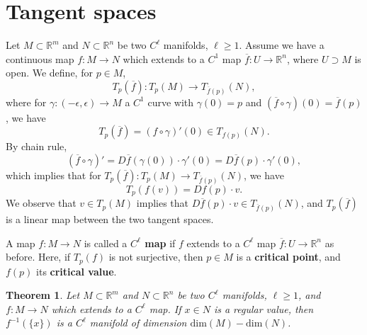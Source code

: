 \documentclass[letter-paper]{tufte-book}
\newtheorem{theorem}{\color{pastel-blue}Theorem}[section]
\begin{document}

\section{Tangent spaces}

Let $M \subset \mathbb{R}^m$ and $N \subset \mathbb{R}^n$ be two $C^\ell$
manifolds, $\ell \geq 1$. Assume we have a continuous map $f : M \to N$ which
extends to a $C^1$ map $\overline{f} : U \to \mathbb{R}^n$, where $U \supset M$
is open. We define, for $p \in M$,
\begin{equation*}
  T_p(\overline{f}) : T_p (M) \to  T_{\overline{f}(p)}(N),
\end{equation*}
where for $\gamma : (-\epsilon, \epsilon) \to M$ a $C^1$ curve with $\gamma(0) =
p$ and $(\overline{f} \circ \gamma)(0) = \overline{f}(p)$, we have
\begin{equation*}
  T_p(\overline{f}) = (f \circ \gamma)'(0) \in T_{f(p)}(N).
\end{equation*}
By chain rule,
\begin{equation*}
  (\overline{f} \circ \gamma)' = D\overline{f}(\gamma(0))\cdot\gamma'(0) = D\overline{f}(p) \cdot \gamma'(0),
\end{equation*}
which implies that for $T_p(\overline{f}) : T_p(M) \to  T_{\overline{f}(p)}(N)$, we have
\begin{equation*}
  T_p(f(v)) = Df(p)\cdot v.
\end{equation*}
We observe that $v \in T_p(M)$ implies that $D\overline{f}(p)\cdot v \in
T_{\overline{f}(p)}(N)$, and $T_p(\overline{f})$ is a linear map between the two
tangent spaces.

A map $f: M\to N$ is called a \textbf{$C^\ell$ map} if $f$ extends to a $C^\ell$
map $\overline{f}: U \to \mathbb{R}^n$ as before. Here, if $T_p(f)$ is not
surjective, then $p \in M$ is a \textbf{critical point}, and $f(p)$ its
\textbf{critical value}.

\begin{theorem}
  Let $M \subset \mathbb{R}^m$ and $N \subset \mathbb{R}^n$ be two $C^\ell$
  manifolds, $\ell \geq 1$, and $f : M \to N$ which extends to a $C^\ell$ map.
  If $x \in N$ is a regular value, then $f^{-1}(\{x\})$ is a $C^\ell$ manifold
  of dimension $\mbox{dim}(M) - \mbox{dim}(N)$.
\end{theorem}
\end{document}
